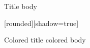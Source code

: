 \documentclass{beamer}
\begin{document}
    \begin{frame}         
         \begin{block}{Title}
              body
         \end{block}
         
        [rounded][shadow=true]
        \begin{block}{Colored title}
              colored body
         \end{block}
    \end{frame}
\end{document}
